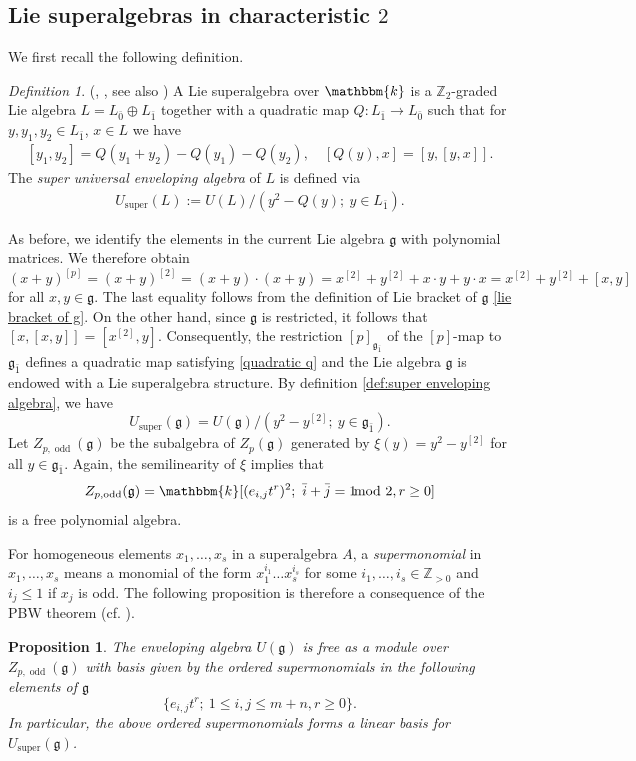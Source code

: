 \documentclass[12pt,reqno]{amsart}
\newcommand{\ZZ}{\mathbb{Z}}
\newcommand{\fg}{\mathfrak{g}}
\newcommand{\kk}{\mathbbm{k}}
\DeclareMathOperator{\super}{super}
\DeclareMathOperator{\odd}{odd}
\numberwithin{equation}{section}
\newtheorem{Proposition}[Theorem]{Proposition}
\theoremstyle{Theorem}
\theoremstyle{remark}
\newtheorem*{Definition}{Definition}
\numberwithin{equation}{section}
\begin{document}
\subsection{Lie superalgebras in characteristic $2$}
We first recall the following definition.
\begin{Definition}(\cite[Subsection 1.2.3]{Bou+20}, \cite[Subsection 2.2]{Bou+23},
see also \cite[Definition 3.1]{EH25})
A Lie superalgebra over $\kk$ is a $\ZZ_2$-graded Lie algebra $L=L_{\bar 0}\oplus L_{\bar 1}$
together with a quadratic map $Q:L_{\bar 1}\rightarrow L_{\bar 0}$
such that for $y,y_1,y_2\in L_{\bar 1}$, $x\in L$ we have
\begin{align}\label{quadratic q}
[y_1,y_2]=Q(y_1+y_2)-Q(y_1)-Q(y_2),\quad [Q(y),x]=[y,[y,x]].  
\end{align}
The {\it super universal enveloping algebra} of $L$ is defined via 
\begin{align}\label{def:super enveloping algebra}
U_{\super}(L):=U(L)/(y^2-Q(y);~y\in L_{\bar 1}).  
\end{align}
\end{Definition}
As before, we identify the elements in the current Lie algebra $\fg$ with polynomial matrices.
We therefore obtain
\[
 (x+y)^{[p]}=(x+y)^{[2]}=(x+y)\cdot (x+y)=x^{[2]}+y^{[2]}+x\cdot y+y\cdot x=x^{[2]}+y^{[2]}+[x,y]
\]
for all $x,y\in\fg$.
The last equality follows from the definition of Lie bracket of $\fg$ \eqref{lie bracket of g}.
On the other hand, since $\fg$ is restricted,
it follows that $[x,[x,y]]=[x^{[2]},y]$.
Consequently, the restriction $[p]_{\fg_{\bar 1}}$ of the $[p]$-map to $\fg_{\bar 1}$
defines a quadratic map satisfying \eqref{quadratic q}
and the Lie algebra $\fg$ is endowed with a Lie superalgebra structure.
By definition \eqref{def:super enveloping algebra}, we have
\[
U_{\super}(\fg)=U(\fg)/(y^2-y^{[2]};~y\in\fg_{\bar 1}).
\]
Let $Z_{p,\odd}(\fg)$ be the subalgebra of $Z_p(\fg)$ generated by $\xi(y)=y^2-y^{[2]}$ for all $y\in\fg_{\bar 1}$.
Again,
the semilinearity of $\xi$ implies that
\[
 Z_{p,\odd}(\fg)=\kk[(e_{i,j}t^r)^2;~\bar i+\bar j=1\!\!\!\!\! \mod 2, r\geq 0]      
\]
is a free polynomial algebra. 

For homogeneous elements $x_1,\dots,x_s$ in a superalgebra $A$,
a {\em supermonomial} in $x_1,\dots,x_s$ means
a monomial of the form $x_1^{i_1}\dots x_s^{i_s}$ for some $ i_1,\dots,i_s\in\ZZ_{>0}$ and $i_j\leq 1$ if $x_j$ is odd.
The following proposition is
therefore a consequence of the PBW theorem (cf. \cite[Propositions 2.3 and 2.8]{Jan98}).
\begin{Proposition}\label{prop:PBW for u superg}
The enveloping algebra $U(\fg)$ is free as a module over $Z_{p,\odd}(\fg)$ with basis given by the ordered supermonomials in the following elements of $\fg$
   \[
\{e_{i,j}t^r;~1\leq i,j\leq m+n, r\geq 0\}.
   \]
In particular, the above ordered supermonomials forms a linear basis for $U_{\super}(\fg)$.
\end{Proposition}
\end{document}
